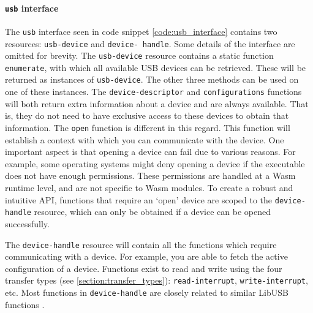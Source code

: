 \paragraph{\texttt{usb} interface}
The \texttt{usb} interface seen in code snippet \ref{code:usb_interface} contains two resources: \texttt{usb-device} and \texttt{device- handle}. Some details of the interface are omitted for brevity. The \texttt{usb-device} resource contains a static function \texttt{enumerate}, with which all available USB devices can be retrieved. These will be returned as instances of \texttt{usb-device}. The other three methods can be used on one of these instances. The \texttt{device-descriptor} and \texttt{configurations} functions will both return extra information about a device and are always available. That is, they do not need to have exclusive access to these devices to obtain that information. The \texttt{open} function is different in this regard. This function will establish a context with which you can communicate with the device. One important aspect is that opening a device can fail due to various reasons. For example, some operating systems might deny opening a device if the executable does not have enough permissions. These permissions are handled at a \acrshort{Wasm} runtime level, and are not specific to \acrshort{Wasm} modules. To create a robust and intuitive API, functions that require an `open' device are scoped to the \texttt{device-handle} resource, which can only be obtained if a device can be opened successfully.

The \texttt{device-handle} resource will contain all the functions which require communicating with a device. For example, you are able to fetch the active configuration of a device. Functions exist to read and write using the four transfer types (see \ref{section:transfer_types}): \texttt{read-interrupt}, \texttt{write-interrupt}, etc. Most functions in \texttt{device-handle} are closely related to similar LibUSB functions \cite{libusb_docs}. \\

